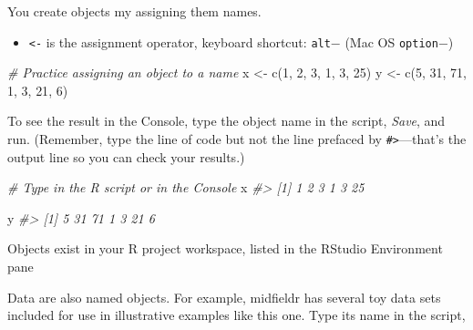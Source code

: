 \documentclass[
]{book}
\newenvironment{Shaded}{\begin{snugshade}}{\end{snugshade}}
\newcommand{\CommentTok}[1]{\textcolor[rgb]{0.56,0.35,0.01}{\textit{#1}}}
\newcommand{\DecValTok}[1]{\textcolor[rgb]{0.00,0.00,0.81}{#1}}
\newcommand{\FunctionTok}[1]{\textcolor[rgb]{0.00,0.00,0.00}{#1}}
\newcommand{\NormalTok}[1]{#1}
\newcommand{\OtherTok}[1]{\textcolor[rgb]{0.56,0.35,0.01}{#1}}
\providecommand{\tightlist}{%
  \setlength{\itemsep}{0pt}\setlength{\parskip}{0pt}}
\begin{document}
You create objects my assigning them names.

\begin{itemize}
\tightlist
\item
  \texttt{\textless{}-} is the assignment operator, keyboard shortcut: \texttt{alt}\(-\) (Mac OS \texttt{option}\(-\))
\end{itemize}

\begin{Shaded}
\begin{Highlighting}[]
\CommentTok{\# Practice assigning an object to a name}
\NormalTok{x }\OtherTok{\textless{}{-}} \FunctionTok{c}\NormalTok{(}\DecValTok{1}\NormalTok{, }\DecValTok{2}\NormalTok{, }\DecValTok{3}\NormalTok{, }\DecValTok{1}\NormalTok{, }\DecValTok{3}\NormalTok{, }\DecValTok{25}\NormalTok{)}
\NormalTok{y }\OtherTok{\textless{}{-}} \FunctionTok{c}\NormalTok{(}\DecValTok{5}\NormalTok{, }\DecValTok{31}\NormalTok{, }\DecValTok{71}\NormalTok{, }\DecValTok{1}\NormalTok{, }\DecValTok{3}\NormalTok{, }\DecValTok{21}\NormalTok{, }\DecValTok{6}\NormalTok{)}
\end{Highlighting}
\end{Shaded}

To see the result in the Console, type the object name in the script, \emph{Save}, and run. (Remember, type the line of code but not the line prefaced by \texttt{\#\textgreater{}}---that's the output line so you can check your results.)

\begin{Shaded}
\begin{Highlighting}[]
\CommentTok{\# Type in the R script or in the Console}
\NormalTok{x}
\CommentTok{\#\textgreater{} [1]  1  2  3  1  3 25}

\NormalTok{y}
\CommentTok{\#\textgreater{} [1]  5 31 71  1  3 21  6}
\end{Highlighting}
\end{Shaded}

Objects exist in your R project workspace, listed in the RStudio Environment pane

Data are also named objects. For example, midfieldr has several toy data sets included for use in illustrative examples like this one. Type its name in the script,
\end{document}
